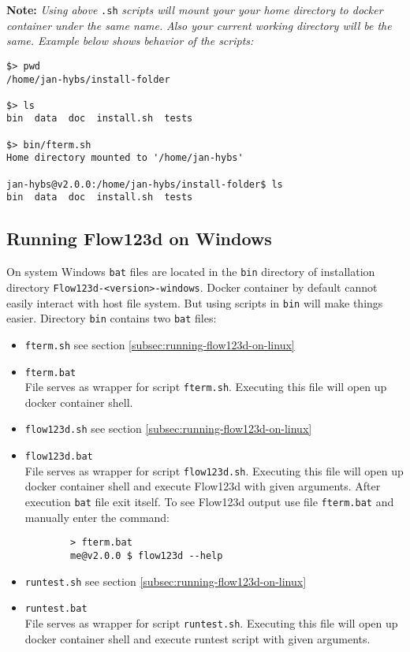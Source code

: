 \documentclass[12pt,a4paper]{report}
\begin{document}
\textbf{Note:}
\textit{Using above} \verb'.sh' \textit{scripts will mount your your home  directory to docker container under the same name.}
\textit{Also your current working directory will be the same. Example below shows behavior of the scripts:}
\begin{verbatim}
$> pwd
/home/jan-hybs/install-folder

$> ls
bin  data  doc	install.sh  tests

$> bin/fterm.sh
Home directory mounted to '/home/jan-hybs'

jan-hybs@v2.0.0:/home/jan-hybs/install-folder$ ls
bin  data  doc	install.sh  tests
\end{verbatim}


\subsection{Running Flow123d on Windows}
On system Windows \verb'bat' files are located in the \verb'bin' directory of installation directory \verb'Flow123d-<version>-windows'.
Docker container by default cannot easily interact with host file system. But using scripts in \verb'bin' will make things easier.
Directory \verb'bin' contains two \verb'bat' files:
\begin{itemize}
	\item \verb'fterm.sh' see section \ref{subsec:running-flow123d-on-linux}
	
	\item \verb'fterm.bat' \\
	File serves as wrapper for script \verb'fterm.sh'. Executing this file will open up docker container shell.

	\item \verb'flow123d.sh' see section \ref{subsec:running-flow123d-on-linux}	
	
	\item \verb'flow123d.bat' \\
	File serves as wrapper for script \verb'flow123d.sh'. Executing this file will open up docker container shell and execute 
	Flow123d with given arguments. After execution \verb'bat' file exit itself. To see Flow123d output use file \verb'fterm.bat'
	and manually enter the command:
	\begin{verbatim}
		> fterm.bat
		me@v2.0.0 $ flow123d --help
	\end{verbatim}

	\item \verb'runtest.sh' see section \ref{subsec:running-flow123d-on-linux}	
	
	\item \verb'runtest.bat' \\
	File serves as wrapper for script \verb'runtest.sh'. Executing this file will open up docker container shell and execute 
	runtest script with given arguments.
\end{itemize}
\end{document}
